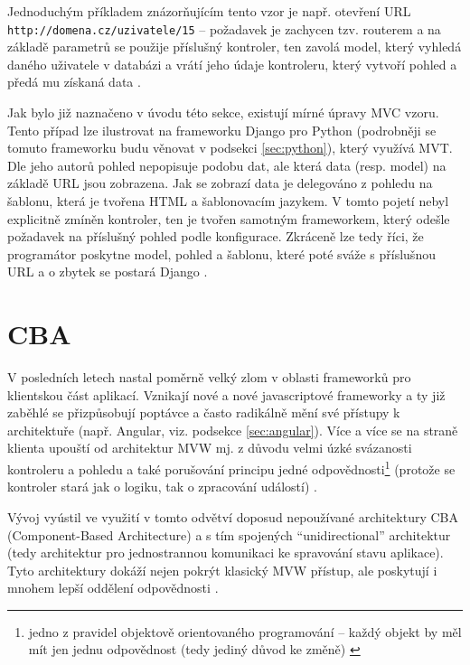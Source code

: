     Jednoduchým příkladem znázorňujícím tento vzor je např. otevření URL \verb|http://domena.cz/uzivatele/15| -- požadavek je zachycen tzv. routerem a na základě parametrů se použije příslušný kontroler, ten zavolá model, který vyhledá daného uživatele v databázi a vrátí jeho údaje kontroleru, který vytvoří pohled a předá mu získaná data \cite{mvc-cz1}.
    
    Jak bylo již naznačeno v úvodu této sekce, existují mírné úpravy MVC vzoru. Tento případ lze ilustrovat na frameworku Django pro Python (podrobněji se tomuto frameworku budu věnovat v podsekci \ref{sec:python}), který využívá MVT. Dle jeho autorů \cite{django-docs-mvp} pohled nepopisuje podobu dat, ale která data (resp. model) na základě URL jsou zobrazena. Jak se zobrazí data je delegováno z pohledu na šablonu, která je tvořena HTML a šablonovacím jazykem. V tomto pojetí nebyl explicitně zmíněn kontroler, ten je tvořen samotným frameworkem, který odešle požadavek na příslušný pohled podle konfigurace. Zkráceně lze tedy říci, že programátor poskytne model, pohled a šablonu, které poté sváže s příslušnou URL a o zbytek se postará Django \cite{django-mvp2}.
    
    \section{CBA}\label{cba}
    V posledních letech nastal poměrně velký zlom v oblasti frameworků pro klientskou část aplikací. Vznikají nové a nové javascriptové frameworky a ty již zaběhlé se přizpůsobují poptávce a často radikálně mění své přístupy k architektuře (např. Angular, viz. podsekce \ref{sec:angular}). Více a více se na straně klienta upouští od architektur MVW mj. z důvodu velmi úzké svázanosti kontroleru a pohledu a také porušování principu jedné odpovědnosti\footnote{jedno z pravidel objektově orientovaného programování -- každý objekt by měl mít jen jednu odpovědnost (tedy jediný důvod ke změně) \cite{single-responsibility}} (protože se kontroler stará jak o logiku, tak o zpracování událostí) \cite{mvc-frontend}.
    
    Vývoj vyústil ve využití v tomto odvětví doposud nepoužívané architektury CBA (Component-Based Architecture) a s tím spojených  \enquote{unidirectional} architektur (tedy architektur pro jednostrannou komunikaci ke spravování stavu aplikace). Tyto architektury dokáží nejen pokrýt klasický MVW přístup, ale poskytují i mnohem lepší oddělení odpovědnosti \cite{mvc-frontend}.
    
